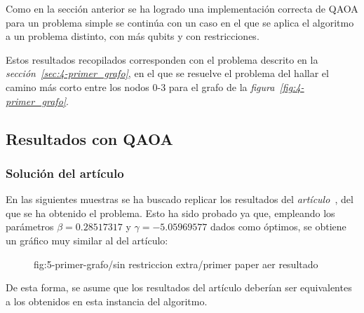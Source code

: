 Como en la sección anterior se ha logrado una implementación correcta de QAOA para un problema simple se continúa con un caso en el que se aplica el algoritmo a un problema distinto, con más qubits y con restricciones.

Estos resultados recopilados corresponden con el problema descrito en la \textit{sección~\ref{sec:4-primer_grafo}}, en el que se resuelve el problema del hallar el camino más corto entre los nodos 0{-}3 para el grafo de la \textit{figura~\ref{fig:4-primer_grafo}}.

\subsection{Resultados con QAOA}

\subsubsection{Solución del artículo\label{sec:5-primer-paper-resultados-qiskit}}
En las siguientes muestras se ha buscado replicar los resultados del \textit{artículo~\cite{multi-objective_routing_optimization}}, del que se ha obtenido el problema. Esto ha sido probado ya que, empleando los parámetros \(\beta = 0.28517317\) y \(\gamma = -5.05969577 \) dados como óptimos, se obtiene un gráfico muy similar al del artículo:

\begin{figure}[]{fig:5-primer-grafo/sin restriccion extra/primer paper aer resultado}{}
   \hfill
\end{figure}

De esta forma, se asume que los resultados del artículo deberían ser equivalentes a los obtenidos en esta instancia del algoritmo.

